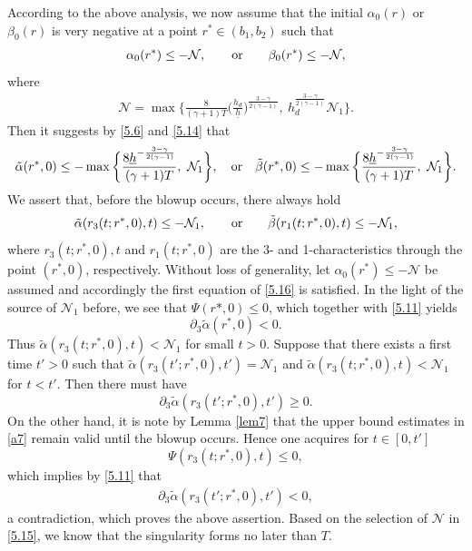 \documentclass[11pt,reqno]{article}
\newcommand{\fr}{\frac}
\newcommand{\pa}{\partial}
\numberwithin{equation}{section}
\begin{document}
According to the above analysis, we now assume that the initial $\alpha_0(r)$ or $\beta_0(r)$ is very negative at a point $r^*\in(b_1,b_2)$ such that
\begin{align}\label{5.14}
\alpha_0 (r^*)\leq -\mathcal{N},\qquad {\rm or}\qquad \beta_0 (r^*) \leq -\mathcal{N},
\end{align}
where
\begin{align}\label{5.15}
\mathcal{N}=\max\bigg\{\fr{8}{(\gamma+1)T} \Big(\fr{h_d}{\underline{h}}\Big)^{\fr{3-\gamma}{2(\gamma-1)}},\ h_{d}^{\fr{3-\gamma}{2(\gamma-1)}}\mathcal{N}_1\bigg\}.
\end{align}
Then it suggests by \eqref{5.6} and \eqref{5.14} that
\begin{align}\label{5.16}
\tilde\alpha (r^*,0)\leq -\max\bigg\{\fr{8{\underline{h}}^{-\fr{3-\gamma}{2(\gamma-1)}}}{(\gamma+1)T},\ \mathcal{N}_1\bigg\},\quad {\rm or}\quad \tilde\beta (r^*,0) \leq -\max\bigg\{\fr{8{\underline{h}}^{-\fr{3-\gamma}{2(\gamma-1)}}}{(\gamma+1)T} ,\ \mathcal{N}_1\bigg\}.
\end{align}
We assert that, before the blowup occurs, there always hold
\begin{align}\label{5.17}
\tilde\alpha(r_3(t;r^*,0),t)\leq -\mathcal{N}_1,\qquad {\rm or}\qquad \tilde\beta(r_1(t;r^*,0),t) \leq -\mathcal{N}_1,
\end{align}
where $r_3(t;r^*,0),t$ and $r_1(t;r^*,0)$ are the 3- and 1-characteristics through the point $(r^*,0)$, respectively. Without loss of generality, let $\alpha_0 (r^*)\leq -\mathcal{N}$ be assumed and accordingly the first equation of \eqref{5.16} is satisfied. In the light of the source of $\mathcal{N}_1$ before, we see that $\Psi(r*,0)\leq0$, which together with \eqref{5.11} yields
$$
\pa_3\tilde\alpha(r^*,0) <0.
$$
Thus $\tilde\alpha(r_3(t;r^*,0),t)<\mathcal{N}_1$ for small $t>0$. Suppose that there exists a first time $t'>0$ such that $\tilde\alpha(r_3(t';r^*,0),t')=\mathcal{N}_1$ and $\tilde\alpha(r_3(t;r^*,0),t)<\mathcal{N}_1$ for $t<t'$. Then there must have
$$
\pa_3\tilde\alpha(r_3(t';r^*,0),t')\geq0.
$$
On the other hand, it is note by Lemma \ref{lem7} that the upper bound estimates in \eqref{a7} remain valid until the blowup occurs. Hence one acquires for $t\in[0,t']$
$$
\Psi(r_3(t;r^*,0),t)\leq 0,
$$
which implies by \eqref{5.11} that
\begin{align*}
\pa_3 \tilde\alpha(r_3(t';r^*,0),t') <0,
\end{align*}
a contradiction, which proves the above assertion. Based on the selection of $\mathcal{N}$ in \eqref{5.15}, we know that the singularity forms no later than $T$.
\end{document}
